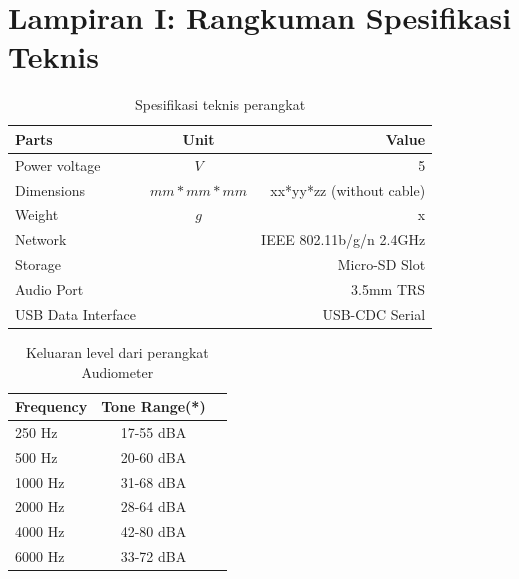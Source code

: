 \documentclass[11pt,a4paper,twoside,onecolumn]{book}
\begin{document}
		\section{Lampiran I: Rangkuman Spesifikasi Teknis}
		\begin{table}[H]
			\centering
			\caption{Spesifikasi teknis perangkat}
			\begin{tabular}{| l | c | r |}
				\hline
				Parts & Unit & Value \\
				\hline
				\hline
				Power voltage & $V$ & 5 \\
				\hline
				Dimensions & $mm*mm*mm$ & xx*yy*zz (without cable) \\
				\hline
				Weight & $g$ & x \\
				\hline
				Network & & IEEE 802.11b/g/n 2.4GHz \\
				\hline
				Storage & & Micro-SD Slot \\
				\hline
				Audio Port & & 3.5mm TRS \\
				\hline
				USB  Data Interface & & USB-CDC Serial \\
				\hline
				
			\end{tabular}
		\end{table}
		
	\begin{table}[H]
		\centering
		\caption{Keluaran level dari perangkat Audiometer}
		\begin{tabular}{| l | c | r |}
			\hline 
			Frequency & Tone Range(*) \\
			\hline
			\hline
			250 Hz & 17-55 dBA \\
			\hline
			500 Hz & 20-60 dBA \\
			\hline
			1000 Hz & 31-68 dBA \\
			\hline
			2000 Hz & 28-64 dBA \\
			\hline
			4000 Hz & 42-80 dBA \\
			\hline
			6000 Hz & 33-72 dBA \\
			\hline
		\end{tabular}
	\end{table}
	

		
	\newpage
	
	
	
\end{document}
